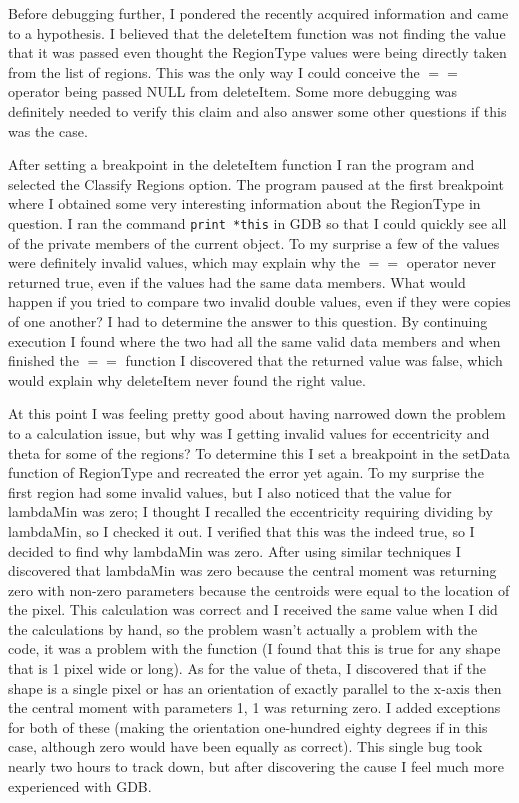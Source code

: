 \documentclass[pdftex, 11pt]{article}
\begin{document}
Before debugging further, I pondered the recently acquired information and came to a hypothesis.  I believed that the
deleteItem function was not finding the value that it was passed even thought the RegionType values were being directly
taken from the list of regions.  This was the only way I could conceive the $==$ operator being passed NULL from
deleteItem.  Some more debugging was definitely needed to verify this claim and also answer some other questions if this
was the case.

After setting a breakpoint in the deleteItem function I ran the program and selected the Classify Regions option.  The
program paused at the first breakpoint where I obtained some very interesting information about the RegionType in
question.  I ran the command \texttt{print *this} in GDB so that I could quickly see all of the private members of the
current object.  To my surprise a few of the values were definitely invalid values, which may explain why the $==$
operator never returned true, even if the values had the same data members.  What would happen if you tried to compare
two invalid double values, even if they were copies of one another?  I had to determine the answer to this question.  By
continuing execution I found where the two had all the same valid data members and when finished the $==$ function I
discovered that the returned value was false, which would explain why deleteItem never found the right value.

At this point I was feeling pretty good about having narrowed down the problem to a calculation issue, but why was I
getting invalid values for eccentricity and theta for some of the regions?  To determine this I set a breakpoint in the
setData function of RegionType and recreated the error yet again.  To my surprise the first region had some invalid
values, but I also noticed that the value for lambdaMin was zero; I thought I recalled the eccentricity requiring
dividing by lambdaMin, so I checked it out.  I verified that this was the indeed true, so I decided to find why
lambdaMin was zero.  After using similar techniques I discovered that lambdaMin was zero because the central moment was
returning zero with non-zero parameters because the centroids were equal to the location of the pixel.  This calculation
was correct and I received the same value when I did the calculations by hand, so the problem wasn't actually a problem
with the code, it was a problem with the function (I found that this is true for any shape that is 1 pixel wide or
long).  As for the value of theta, I discovered that if the shape is a single pixel or has an orientation of exactly
parallel to the x-axis then the central moment with parameters 1, 1 was returning zero.  I added exceptions for both of
these (making the orientation one-hundred eighty degrees if in this case, although zero would have been equally as
correct).  This single bug took nearly two hours to track down, but after discovering the cause I feel much more
experienced with GDB.
\end{document}
